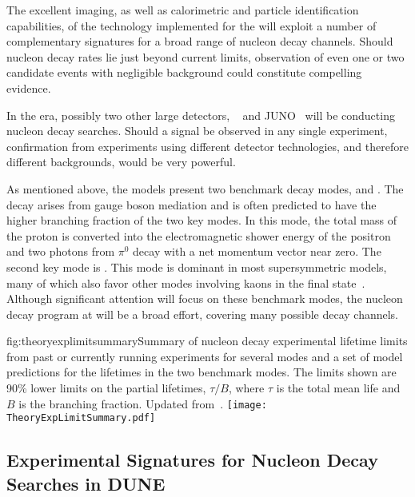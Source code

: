 The excellent imaging, as well as calorimetric and particle identification capabilities, of the  technology  implemented for the   will exploit a number of complementary signatures for a broad range of nucleon decay channels.  Should nucleon decay rates lie just beyond current limits, observation of even one or two candidate events with negligible background could constitute compelling evidence.

In the  era, possibly two other large detectors, \hyperk~\cite{Abe:2018uyc} and JUNO~\cite{Djurcic:2015vqa} will be conducting nucleon decay searches. Should a signal be observed in any single experiment, confirmation from experiments using different detector technologies, and therefore different backgrounds, would be very powerful.

As mentioned above, the  models present two benchmark decay modes, \ptoepizero and \ptoknubar.  The decay \ptoepizero arises from gauge boson mediation and is often predicted to have the higher branching fraction of the two key modes. In this mode, the total mass of the proton is converted into the electromagnetic shower energy of the positron and two photons from $\pi^0$ decay with a net momentum vector near zero. 
The second key mode is \ptoknubar. This mode is dominant in most supersymmetric  models,
many of which also favor other modes involving kaons in the final state~\cite{Dimopoulos:1981dw}.
Although significant attention will focus on these benchmark modes, the nucleon decay program at  will be a broad effort, covering many possible decay channels.

\begin{dunefigure}{fig:theoryexplimitsummary}{Summary of nucleon decay experimental lifetime limits from past or currently running experiments for several modes and a set of  model predictions for the lifetimes in the two benchmark modes.  The limits shown are 90\%  lower limits on the partial lifetimes, $\tau/B$, where $\tau$ is the total mean life and $B$ is the branching fraction. Updated from~\cite{Babu:2013jba}.}
\texttt{[image: TheoryExpLimitSummary.pdf]}
\end{dunefigure}

\subsection{Experimental Signatures for Nucleon Decay Searches in DUNE}
\label{subsec:nonaccel-ndk-dune}

